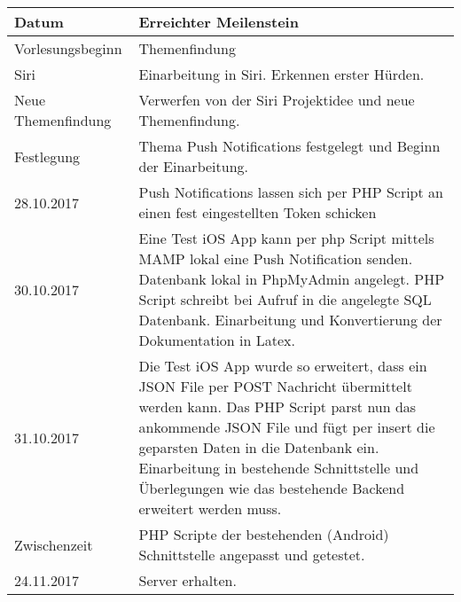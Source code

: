 \noindent%
\begin{tabularx}{\textwidth}{|p{}|X| }
\hline
\textbf{Datum} & \textbf{Erreichter Meilenstein}  \\ \hline 

Vorlesungsbeginn & Themenfindung \\ \hline

Siri & Einarbeitung in Siri. Erkennen erster Hürden. \\ \hline

Neue Themenfindung & Verwerfen von der Siri Projektidee und neue Themenfindung. \\ \hline

Festlegung & Thema Push Notifications festgelegt und Beginn der Einarbeitung. \\ \hline

28.10.2017 & Push Notifications lassen sich per PHP Script an einen fest eingestellten Token schicken \\ \hline

30.10.2017 & Eine Test iOS App kann per php Script mittels MAMP lokal eine Push Notification senden. \newline
Datenbank lokal in PhpMyAdmin angelegt. \newline
PHP Script schreibt bei Aufruf in die angelegte SQL Datenbank. \newline
Einarbeitung und Konvertierung der Dokumentation in Latex.
 \\ \hline
 31.10.2017 & Die Test iOS App wurde so erweitert, dass ein JSON File per POST Nachricht übermittelt werden kann.\newline
Das PHP Script parst nun das ankommende JSON File und fügt per insert die geparsten Daten in die Datenbank ein.\newline 
Einarbeitung in bestehende Schnittstelle und Überlegungen wie das bestehende Backend erweitert werden muss. 
 \\ \hline
 

Zwischenzeit & PHP Scripte der bestehenden (Android) Schnittstelle angepasst und getestet. \newline
\\ \hline 
 
 
24.11.2017 & Server erhalten. \newline
\\ \hline 
 
 

\end{tabularx}

\newpage


